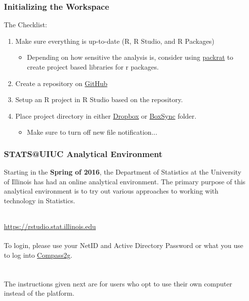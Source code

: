 \documentclass{beamer}\usepackage[]{graphicx}\usepackage[]{color}
\begin{document}
\begin{frame}
\frametitle{Initializing the Workspace} 

The Checklist:
\begin{enumerate}
\item Make sure everything is up-to-date (R, R Studio, and R Packages)
\begin{itemize}
\item Depending on how sensitive the analysis is, consider using \href{http://cran.r-project.org/web/packages/packrat/index.html}{packrat} to create project based libraries for r packages.
\end{itemize}
\item Create a repository on \href{http://github.com}{GitHub}
\item Setup an R project in R Studio based on the repository.
\item Place project directory in either \href{www.dropbox.com}{Dropbox} or \href{https://app.box.com/}{BoxSync} folder.
\begin{itemize}
\item Make sure to turn off new file notification... 
\end{itemize}
\end{enumerate}

\end{frame}

\begin{frame}
\frametitle{STATS@UIUC Analytical Environment}
Starting in the \textbf{Spring of 2016}, the Department of Statistics at the University of Illinois has had an online analytical environment. The primary purpose of this analytical environment is to try out various approaches to working with technology in Statistics.
\\$ $

{\Large
\centering
\url{https://rstudio.stat.illinois.edu}
}
$ $\\$ $\\
To login, please use your NetID and Active Directory Password or what you use to log into \href{https://compass2g.illinois.edu}{Compass2g}. 
\\$ $\\$ $\\ 
The instructions given next are for users who opt to use their own computer instead of the platform.
\end{frame}
\end{document}
